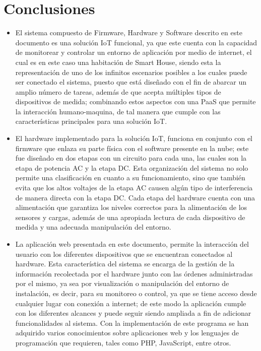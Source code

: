 \section{Conclusiones}

\begin{itemize}
	\item El sistema compuesto de Firmware, Hardware y Software descrito en este documento es una solución IoT funcional, ya que este cuenta con la capacidad de monitorear y controlar un entorno de aplicación por medio de internet, el cual es en este caso una habitación de Smart House, siendo esta la representación de uno de los infinitos escenarios posibles a los cuales puede ser conectado el sistema, puesto que está diseñado con el fin de abarcar un amplio número de tareas, además de que acepta múltiples tipos de dispositivos de medida; combinando estos aspectos con una PaaS que permite la interacción humano-maquina, de tal manera que cumple con las características principales para una solución IoT.\\
	
	\item El hardware implementado para la solución IoT, funciona en conjunto con el firmware que enlaza su parte física con el software presente en la nube; este fue diseñado en dos etapas con un circuito para cada una, las cuales son la etapa de potencia AC y la etapa DC. Esta organización del sistema no solo permite una clasificación en cuanto a su funcionamiento, sino que también evita que los altos voltajes de la etapa AC causen algún tipo de interferencia de manera directa con la etapa DC. Cada etapa del hardware cuenta con una alimentación que garantiza los niveles correctos para la alimentación de los sensores y cargas, además de una apropiada lectura de cada dispositivo de medida y una adecuada manipulación del entorno.\\
	
	\item La aplicación web presentada en este documento, permite la interacción del usuario con los diferentes dispositivos que se encuentran conectados al hardware. Esta característica del sistema se encarga de la gestión de la información recolectada por el hardware junto con las órdenes administradas por el mismo, ya sea por visualización o manipulación del entorno de instalación, es decir, para su monitoreo o control, ya que se tiene acceso desde cualquier lugar con conexión a internet; de este modo la aplicación cumple con los diferentes alcances y puede seguir siendo ampliada a fin de adicionar funcionalidades al sistema. Con la implementación de este programa se han adquirido varios conocimientos sobre aplicaciones web y los lenguajes de programación que requieren, tales como PHP, JavaScript, entre otros.\\
	

\end{itemize}
